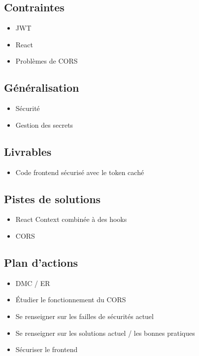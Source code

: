 \subsection*{Contraintes}
{}
\begin{itemize}
	\item JWT
	\item React
	\item Problèmes de CORS
\end{itemize}

\subsection*{Généralisation}
{}
\begin{itemize}
	\item Sécurité
	\item Gestion des secrets
\end{itemize}

\subsection*{Livrables}
{}
\begin{itemize}
	\item Code frontend sécurisé avec le token caché
\end{itemize}

\newpage

\subsection*{Pistes de solutions}
{}
\begin{itemize}
	\item React Context combinée à des hooks
	\item CORS
\end{itemize}

\subsection*{Plan d'actions}
{}
\begin{itemize}
	\item DMC / ER
	\item Étudier le fonctionnement du CORS
	\item Se renseigner sur les failles de sécurités actuel 
	\item Se renseigner sur les solutions actuel / les bonnes pratiques
	\item Sécuriser le frontend
\end{itemize}

